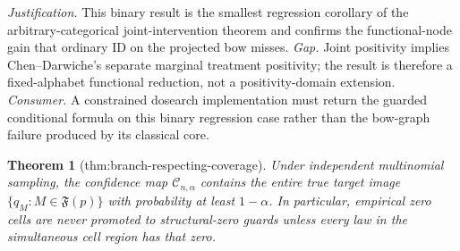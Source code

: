 \documentclass{article}
\newtheorem{theorem}{Theorem}
\begin{document}
\par\smallskip\noindent \textit{Justification.} This binary result is the smallest regression corollary of the arbitrary-categorical joint-intervention theorem and confirms the functional-node gain that ordinary ID on the projected bow misses. \textit{Gap.} Joint positivity implies Chen--Darwiche's separate marginal treatment positivity; the result is therefore a fixed-alphabet functional reduction, not a positivity-domain extension. \textit{Consumer.} A constrained dosearch implementation must return the guarded conditional formula on this binary regression case rather than the bow-graph failure produced by its classical core.

\begin{theorem}[thm:branch-respecting-coverage]\label{thm:branch-respecting-coverage}
Under independent multinomial sampling, the confidence map \(\mathcal C_{n,\alpha}\) contains the entire true target image \(\{q_M:M\in\mathfrak F(p)\}\) with probability at least \(1-\alpha\). In particular, empirical zero cells are never promoted to structural-zero guards unless every law in the simultaneous cell region has that zero.
\end{theorem}
\end{document}
